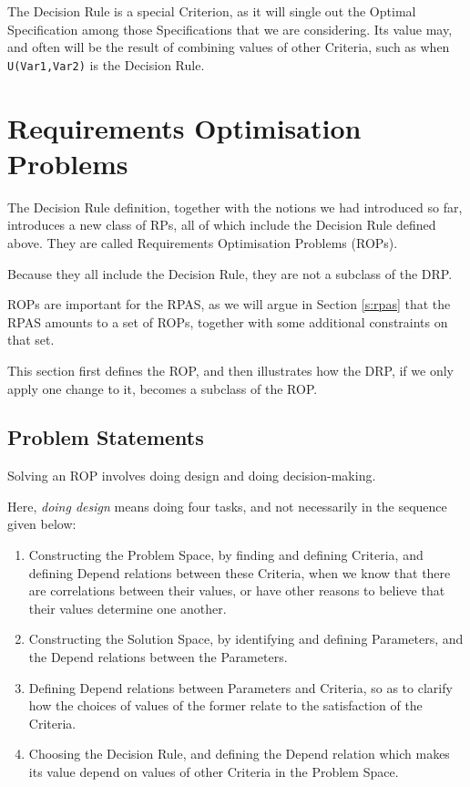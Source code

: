 \documentclass[graybox]{svmult}
\newcommand{\zi}[1]{\textit{#1}}
\newcommand{\xt}[1]{\texttt{#1}}
\newcommand{\req}[1]{\xt{#1}}
\newcommand{\RP}{RP}
\newcommand{\RPAS}{RPAS}
\newcommand{\ZJRP}{DRP}
\newcommand{\SolutionSpace}{Solution Space}
\newcommand{\ProblemSpace}{Problem Space}
\newcommand{\Specification}{Specification}
\newcommand{\Criterion}{Criterion}
\newcommand{\Criteria}{Criteria}
\newcommand{\Parameter}{Parameter}
\newcommand{\Depend}{Depend}
\newcommand{\OptimalSpecification}{Optimal Specification}
\newcommand{\DecisionRule}{Decision Rule}
\newcommand{\ROPfull}{Requirements Optimisation Problem}
\newcommand{\ROP}{ROP}
\begin{document}
The \DecisionRule{} is a special \Criterion, as it will single out the \OptimalSpecification{} among those \Specification s that we are considering. Its value may, and often will be the result of combining values of other \Criteria, such as when \req{U(Var1,Var2)} is the \DecisionRule.



%
\section{\ROPfull s}\label{s:rop}
The \DecisionRule{} definition, together with the notions we had introduced so far, introduces a new class of \RP s, all of which include the \DecisionRule{} defined above. They are called \ROPfull s (\ROP s). 

Because they all include the \DecisionRule, they are not a subclass of the \ZJRP.

\ROP s are important for the \RPAS, as we will argue in Section \ref{s:rpas} that the \RPAS{} amounts to  a set of \ROP s, together with some additional constraints on that set.

This section first defines the \ROP, and then illustrates how the \ZJRP, if we only apply one change to it, becomes a subclass of the \ROP.


%
\subsection{Problem Statements}\label{s:rop:definition}
Solving an \ROP{} involves doing design and doing decision-making. 

Here, \zi{doing design} means doing four tasks, and not necessarily in the sequence given below: 
\begin{enumerate}
    \item{Constructing the \ProblemSpace, by finding and defining \Criteria, and defining \Depend{} relations between these \Criteria, when we know that there are correlations between their values, or have other reasons to believe that their values determine one another.}
    \item{Constructing the \SolutionSpace, by identifying and defining \Parameter s, and the \Depend{} relations between the \Parameter s.}
    \item{Defining \Depend{} relations between \Parameter s and \Criteria, so as to clarify how the choices of values of the former relate to the satisfaction of the \Criteria.}
    \item{Choosing the \DecisionRule, and defining the \Depend{} relation which makes its value depend on values of other \Criteria{} in the \ProblemSpace.}
\end{enumerate}
\end{document}
